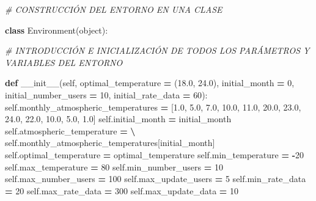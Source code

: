 \documentclass[
]{book}
\newenvironment{Shaded}{\begin{snugshade}}{\end{snugshade}}
\newcommand{\BuiltInTok}[1]{#1}
\newcommand{\CommentTok}[1]{\textcolor[rgb]{0.56,0.35,0.01}{\textit{#1}}}
\newcommand{\DecValTok}[1]{\textcolor[rgb]{0.00,0.00,0.81}{#1}}
\newcommand{\FloatTok}[1]{\textcolor[rgb]{0.00,0.00,0.81}{#1}}
\newcommand{\FunctionTok}[1]{\textcolor[rgb]{0.00,0.00,0.00}{#1}}
\newcommand{\KeywordTok}[1]{\textcolor[rgb]{0.13,0.29,0.53}{\textbf{#1}}}
\newcommand{\NormalTok}[1]{#1}
\newcommand{\OperatorTok}[1]{\textcolor[rgb]{0.81,0.36,0.00}{\textbf{#1}}}
\newcommand{\VariableTok}[1]{\textcolor[rgb]{0.00,0.00,0.00}{#1}}
\begin{document}
\begin{Shaded}
\begin{Highlighting}[]
\CommentTok{\# CONSTRUCCIÓN DEL ENTORNO EN UNA CLASE}

\KeywordTok{class}\NormalTok{ Environment(}\BuiltInTok{object}\NormalTok{):}
    
    \CommentTok{\# INTRODUCCIÓN E INICIALIZACIÓN DE TODOS LOS PARÁMETROS Y VARIABLES DEL ENTORNO}
    
    \KeywordTok{def} \FunctionTok{\_\_init\_\_}\NormalTok{(}\VariableTok{self}\NormalTok{,}
\NormalTok{                optimal\_temperature }\OperatorTok{=}\NormalTok{ (}\FloatTok{18.0}\NormalTok{, }\FloatTok{24.0}\NormalTok{),}
\NormalTok{                initial\_month }\OperatorTok{=} \DecValTok{0}\NormalTok{,}
\NormalTok{                initial\_number\_users }\OperatorTok{=} \DecValTok{10}\NormalTok{,}
\NormalTok{                initial\_rate\_data }\OperatorTok{=} \DecValTok{60}\NormalTok{):}
        \VariableTok{self}\NormalTok{.monthly\_atmospheric\_temperatures }\OperatorTok{=}\NormalTok{ [}\FloatTok{1.0}\NormalTok{, }\FloatTok{5.0}\NormalTok{, }\FloatTok{7.0}\NormalTok{, }\FloatTok{10.0}\NormalTok{, }\FloatTok{11.0}\NormalTok{, }\FloatTok{20.0}\NormalTok{,}
                                                \FloatTok{23.0}\NormalTok{, }\FloatTok{24.0}\NormalTok{, }\FloatTok{22.0}\NormalTok{, }\FloatTok{10.0}\NormalTok{, }\FloatTok{5.0}\NormalTok{, }\FloatTok{1.0}\NormalTok{]}
        \VariableTok{self}\NormalTok{.initial\_month }\OperatorTok{=}\NormalTok{ initial\_month}
        \VariableTok{self}\NormalTok{.atmospheric\_temperature }\OperatorTok{=} \OperatorTok{\textbackslash{}}
                                \VariableTok{self}\NormalTok{.monthly\_atmospheric\_temperatures[initial\_month]}
        \VariableTok{self}\NormalTok{.optimal\_temperature }\OperatorTok{=}\NormalTok{ optimal\_temperature}
        \VariableTok{self}\NormalTok{.min\_temperature }\OperatorTok{=} \OperatorTok{{-}}\DecValTok{20}
        \VariableTok{self}\NormalTok{.max\_temperature }\OperatorTok{=} \DecValTok{80}
        \VariableTok{self}\NormalTok{.min\_number\_users }\OperatorTok{=} \DecValTok{10}
        \VariableTok{self}\NormalTok{.max\_number\_users }\OperatorTok{=} \DecValTok{100}
        \VariableTok{self}\NormalTok{.max\_update\_users }\OperatorTok{=} \DecValTok{5}
        \VariableTok{self}\NormalTok{.min\_rate\_data }\OperatorTok{=} \DecValTok{20}
        \VariableTok{self}\NormalTok{.max\_rate\_data }\OperatorTok{=} \DecValTok{300}
        \VariableTok{self}\NormalTok{.max\_update\_data }\OperatorTok{=} \DecValTok{10}

\end{Highlighting}
\end{Shaded}
\end{document}

